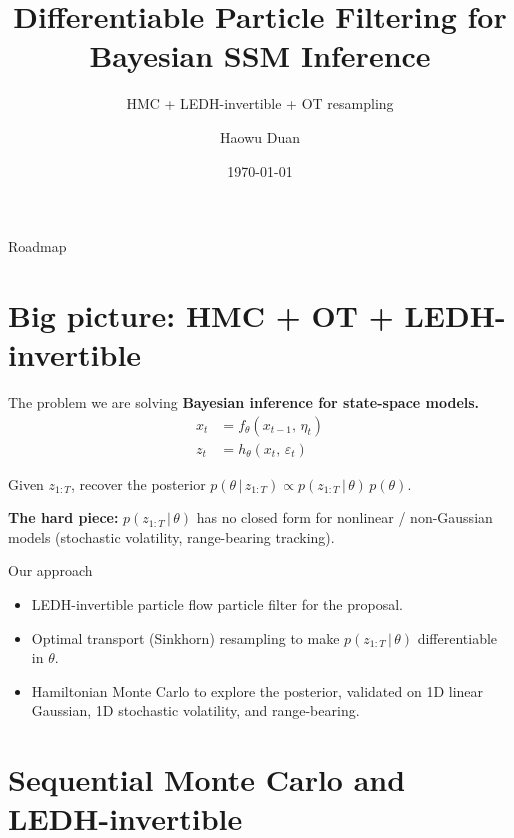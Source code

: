 \documentclass[10pt,aspectratio=169]{beamer}
\title{Differentiable Particle Filtering for Bayesian SSM Inference}
\subtitle{HMC + LEDH-invertible + OT resampling}
\author{Haowu Duan}
\date{\today}
\newcommand{\given}{\,|\,}
\begin{document}
\maketitle

\begin{frame}{Roadmap}
  \tableofcontents
\end{frame}

\section{Big picture: HMC + OT + LEDH-invertible}

\begin{frame}{The problem we are solving}
  \textbf{Bayesian inference for state-space models.}
  \begin{align*}
    x_t &= f_\theta(x_{t-1},\, \eta_t) \\
    z_t &= h_\theta(x_t,\, \varepsilon_t)
  \end{align*}

  Given $z_{1:T}$, recover the posterior $p(\theta \given z_{1:T}) \propto p(z_{1:T}\given\theta)\,p(\theta)$.

  \medskip
  \textbf{The hard piece:} $p(z_{1:T}\given\theta)$ has no closed form for nonlinear / non-Gaussian models (stochastic volatility, range-bearing tracking).
\end{frame}

\begin{frame}{Our approach}
  \begin{itemize}\setlength{\itemsep}{1.2em}
    \item LEDH-invertible particle flow particle filter for the proposal.
    \item Optimal transport (Sinkhorn) resampling to make $p(z_{1:T}\given\theta)$ differentiable in $\theta$.
    \item Hamiltonian Monte Carlo to explore the posterior, validated on 1D linear Gaussian, 1D stochastic volatility, and range-bearing.
  \end{itemize}
\end{frame}

\section{Sequential Monte Carlo and LEDH-invertible}
\end{document}
